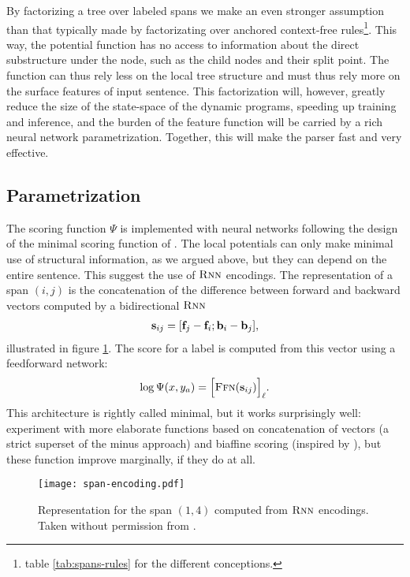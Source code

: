 By factorizing a tree over labeled spans we make an even stronger assumption than that typically made by factorizating over anchored context-free rules\footnote{\cf table \ref{tab:spans-rules} for the different conceptions.}. This way, the potential function has no access to information about the direct substructure under the node, such as the child nodes and their split point. The function can thus rely less on the local tree structure and must thus rely more on the surface features of input sentence. This factorization will, however, greatly reduce the size of the state-space of the dynamic programs, speeding up training and inference, and the burden of the feature function will be carried by a rich neural network parametrization. Together, this will make the parser fast and very effective.

\subsection{Parametrization}
The scoring function $\Psi$ is implemented with neural networks following the design of the minimal scoring function of \citet{stern2017minimal}. The local potentials can only make minimal use of structural information, as we argued above, but they can depend on the entire sentence. This suggest the use of $\textsc{Rnn}$ encodings. The representation of a span $(i, j)$ is the concatenation of the difference between forward and backward vectors computed by a bidirectional $\textsc{Rnn}$
\begin{align}
  \label{eq:potential-function}
  \mathbf{s}_{ij} = [\mathbf{f}_j - \mathbf{f}_i; \mathbf{b}_i - \mathbf{b}_j],
\end{align}
illustrated in figure \ref{fig:span-feature}. The score for a label is computed from this vector using a feedforward network:
\begin{align}
  \log \Psi(x, y_a) = \Big[ \textsc{Ffn}( \mathbf{s}_{ij} ) \Big]_{\ell}.
\end{align}
This architecture is rightly called minimal, but it works surprisingly well: \citet{stern2017minimal} experiment with more elaborate functions based on concatenation of vectors (a strict superset of the minus approach) and biaffine scoring (inspired by \citep{dozat2016deep}), but these function improve marginally, if they do at all.

\begin{figure}
  \texttt{[image: span-encoding.pdf]}
  \caption{Representation for the span $(1, 4)$ computed from $\textsc{Rnn}$ encodings. Taken without permission from \citet{stern2018analyis}.}
  \label{fig:span-feature}
\end{figure}

